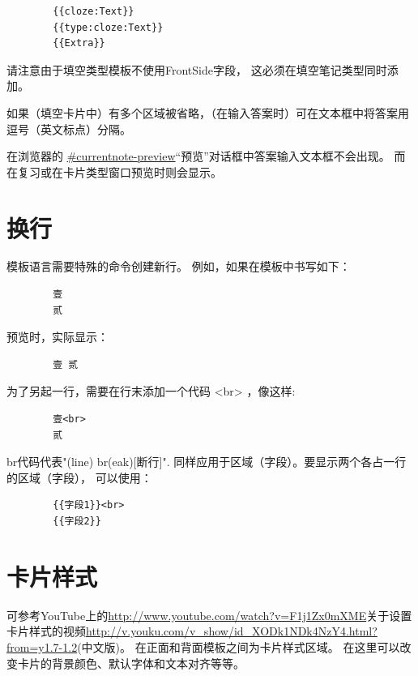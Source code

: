 \documentclass[a4paper]{book}
\begin{document}
	\begin{shaded}\begin{verbatim}
		{{cloze:Text}}
		{{type:cloze:Text}}
		{{Extra}}
		\end{verbatim}\end{shaded}
	请注意由于填空类型模板不使用FrontSide字段， 这必须在填空笔记类型同时添加。
	
	如果（填空卡片中）有多个区域被省略，（在输入答案时）可在文本框中将答案用逗号（英文标点）分隔。
	
	
	
	\begin{shaded}
		在浏览器的 \url{#currentnote-preview}“预览”对话框中答案输入文本框不会出现。 而在复习或在卡片类型窗口预览时则会显示。
	\end{shaded}
	
	\section{换行}
	模板语言需要特殊的命令创建新行。 例如，如果在模板中书写如下：
	
	\begin{shaded}\begin{verbatim}
		壹
		贰
		\end{verbatim}\end{shaded}
	预览时，实际显示：
	\begin{shaded}\begin{verbatim}
		壹 贰
		\end{verbatim}\end{shaded}
	为了另起一行，需要在行末添加一个代码 <br> ，像这样:
	\begin{shaded}\begin{verbatim}
		壹<br>
		贰
		\end{verbatim}\end{shaded}
	br代码代表"(line) br(eak)[断行]".
	同样应用于区域（字段）。要显示两个各占一行的区域（字段）， 可以使用：
	
	\begin{shaded}\begin{verbatim}
		{{字段1}}<br>
		{{字段2}}
		\end{verbatim}\end{shaded}
	\section{卡片样式}\label{cardstyling}
	可参考YouTube上的\url{http://www.youtube.com/watch?v=F1j1Zx0mXME}关于设置卡片样式的视频\url{http://v.youku.com/v_show/id_XODk1NDk4NzY4.html?from=y1.7-1.2}(中文版)。
	在正面和背面模板之间为卡片样式区域。 在这里可以改变卡片的背景颜色、默认字体和文本对齐等等。
	
\end{document}
